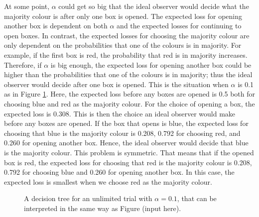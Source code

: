 At some point, $\alpha$ could get so big that the ideal observer would decide what the majority colour is after only one box is opened. The expected loss for opening another box is dependent on both $\alpha$ and the expected losses for continuing to open boxes. In contrast, the expected losses for choosing the majority colour are only dependent on the probabilities that one of the colours is in majority. For example, if the first box is red, the probability that red is in majority increases. Therefore, if $\alpha$ is big enough, the expected loss for opening another box could be higher than the probabilities that one of the colours is in majority; thus the ideal observer would decide after one box is opened. This is the situation when $\alpha$ is 0.1 as in Figure \ref{fig:unlim_a0.1_gk1}. Here, the expected loss before any boxes are opened is 0.5 both for choosing blue and red as the majority colour. For the choice of opening a box, the expected loss is 0.308. This is then the choice an ideal observer would make before any boxes are opened. If the box that opens is blue, the expected loss for choosing that blue is the majority colour is 0.208, 0.792 for choosing red, and 0.260 for opening another box. Hence, the ideal observer would decide that blue is the majority colour. This problem is symmetric. That means that if the opened box is red, the expected loss for choosing that red is the majority colour is 0.208, 0.792 for choosing blue and 0.260 for opening another box. In this case, the expected loss is smallest when we choose red as the majority colour.
\begin{figure}
    \centering
    \scalebox{1}{}
    \caption[IO solution, unlimited. $\alpha=0.1$,$\gamma=\kappa=1$]{A decision tree for an unlimited trial with $\alpha = 0.1$, that can be interpreted in the same way as Figure (input here).}
    \label{fig:unlim_a0.1_gk1}
\end{figure}


